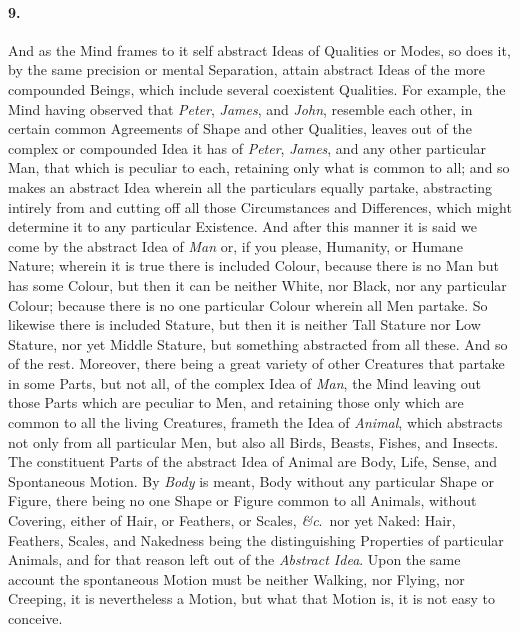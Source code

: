 \documentclass[]{article}
\newenvironment{sectionbody}{\begin{multicols}{2}}{\end{multicols}}
\begin{document}
\begin{sectionbody}
\paragraph{9.} And as the Mind frames to it self abstract Ideas of Qualities or
Modes, so does it, by the same precision or mental Separation,
attain abstract Ideas of the more compounded Beings, which
include several coexistent Qualities.  For example, the Mind
having observed that \emph{Peter}, \emph{James}, and
\emph{John}, resemble each other, in certain common Agreements
of Shape and other Qualities, leaves out of the complex or
compounded Idea it has of \emph{Peter}, \emph{James}, and any
other particular Man, that which is peculiar to each, retaining
only what is common to all; and so makes an abstract Idea wherein
all the particulars equally partake, abstracting intirely from
and cutting off all those Circumstances and Differences, which
might determine it to any particular Existence.  And after this
manner it is said we come by the abstract Idea of \emph{Man}
or, if you please, Humanity, or Humane Nature; wherein it is true
there is included Colour, because there is no Man but has some
Colour, but then it can be neither White, nor Black, nor any
particular Colour; because there is no one particular Colour
wherein all Men partake.  So likewise there is included Stature,
but then it is neither Tall Stature nor Low Stature, nor yet
Middle Stature, but something abstracted from all these.  And so
of the rest.  Moreover, there being a great variety of other
Creatures that partake in some Parts, but not all, of the complex
Idea of \emph{Man}, the Mind leaving out those Parts which are
peculiar to Men, and retaining those only which are common to all
the living Creatures, frameth the Idea of \emph{Animal}, which
abstracts not only from all particular Men, but also all Birds,
Beasts, Fishes, and Insects.  The constituent Parts of the
abstract Idea of Animal are Body, Life, Sense, and Spontaneous
Motion.  By \emph{Body} is meant, Body without any particular
Shape or Figure, there being no one Shape or Figure common to all
Animals, without Covering, either of Hair, or Feathers, or
Scales, \emph{\&c}.\ nor yet Naked: Hair, Feathers, Scales,
and Nakedness being the distinguishing Properties of particular
Animals, and for that reason left out of the \emph{Abstract
Idea}.  Upon the same account the spontaneous Motion must be
neither Walking, nor Flying, nor Creeping, it is nevertheless a
Motion, but what that Motion is, it is not easy to conceive.




\end{sectionbody}
\end{document}
